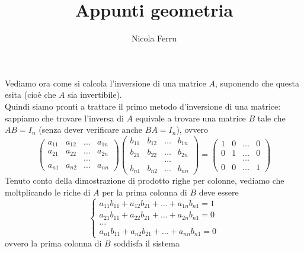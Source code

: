 \documentclass{book}
\title{Appunti geometria}
\author{Nicola Ferru}
\begin{document}
\maketitle
\tableofcontents
\listoftables
\listoffigures






Vediamo ora come si calcola l'inversione di una matrice $A$, suponendo che questa esita (cioè che $A$ sia
invertibile).\\
Quindi siamo pronti a trattare il primo metodo d'inversione di una matrice: sappiamo che trovare l'inversa
di $A$ equivale a trovare una matrice $B$ tale che $AB=I_n$ (senza dever verificare anche $BA=I_n$), ovvero
\begin{equation*}
  \begin{pmatrix}
    a_{11} &a_{12} &\dots & a_{1n}\\
    a_{21} & a_{22} & \dots & a_{2n} \\
           && \dots\\
    a_{n1} & a_{n2} & \dots&a_{nn}
  \end{pmatrix}
  \begin{pmatrix}
    b_{11} &b_{12} &\dots & b_{1n}\\
    b_{21} & b_{22} & \dots & b_{2n} \\
           && \dots\\
    b_{n1} & b_{n2} & \dots&b_{nn}
  \end{pmatrix}=
  \begin{pmatrix}
    1 &0 &\dots&0\\
    0 & 1 &\dots & 0\\
      &&\dots\\
    0 & 0&\dots & 1
  \end{pmatrix}
\end{equation*}
Tenuto conto della dimostrazione di prodotto righe per colonne, vediamo che moltplicando le riche di $A$ per la
prima colonna di $B$ deve essere
\begin{equation*}
  \begin{cases}
    a_{11}b_{11} + a_{12}b_{21}+\dots +a_{1n}b_{n1} =1\\
    a_{21}b_{11} + a_{22}b_{21}+\dots +a_{2n}b_{n1} =0\\
    \dots\\
    a_{n1}b_{11} + a_{n2}b_{21}+\dots +a_{nn}b_{n1} =0
  \end{cases}
\end{equation*}
ovvero la prima colonna di $B$ soddisfa il sistema
\end{document}
